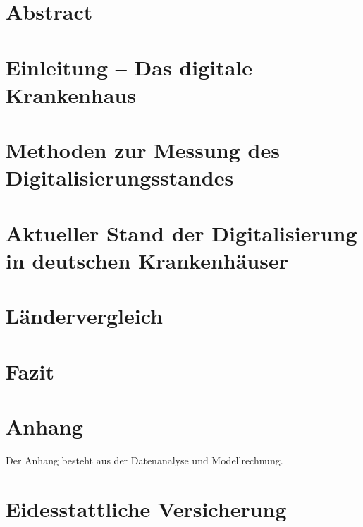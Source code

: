 
\section*{Abstract}

\newpage
{}
\tableofcontents
\newpage
{}
\listoftables
{}
\newpage
{}
\listoffigures
{}
\newpage
{}
% 
\section{Einleitung -- Das digitale Krankenhaus}

\section{Methoden zur Messung des Digitalisierungsstandes}

\section{Aktueller Stand der Digitalisierung in deutschen Krankenhäuser} \label{sec:stand in deutschland}

\section{Ländervergleich} \label{sec:laendervergleich}

\section{Fazit}

\newpage
{}
\printbibliography
{}
\newpage
{}
\section*{Anhang}
Der Anhang besteht aus der Datenanalyse und Modellrechnung.
\newpage
%
\section*{Eidesstattliche Versicherung}

